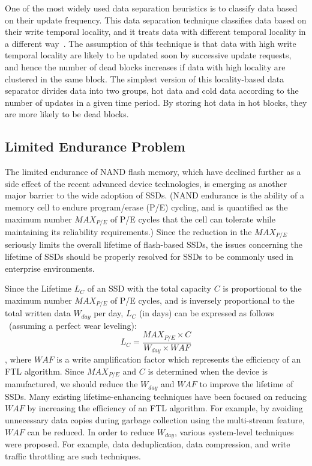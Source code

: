 One of the most widely used data separation heuristics is to classify
data based on their update frequency. This data separation technique classifies
data based on their write temporal locality, and it treats data with different
temporal locality in a different way~\cite{HotCold}. The assumption of this
technique is that data with high write temporal locality are likely to be updated
soon by successive update requests, and hence the number of dead
blocks increases if data with high locality are clustered in the same block.
The simplest version of this locality-based data separator divides data into
two groups, hot data and cold data according to the number of updates in a
given time period. By storing hot data in hot blocks, they are more likely to
be dead blocks.

\subsection{Limited Endurance Problem}

The limited endurance of NAND flash memory, which have
declined further as a side effect of the recent advanced device technologies,
is emerging as another major barrier to the wide adoption of SSDs. (NAND endurance
is the ability of a memory cell to endure program/erase (P/E) cycling, and is
quantified as the maximum number $MAX_{P/E}$ of P/E cycles that the cell can tolerate
while maintaining its reliability requirements.) 
Since the reduction in the $MAX_{P/E}$ seriously limits the overall lifetime of flash-based SSDs,
the issues concerning the lifetime of SSDs should be properly resolved for SSDs to be commonly 
used in enterprise environments.

Since the Lifetime $L_C$ of an SSD with the total capacity $C$ is proportional to 
the maximum number $MAX_{P/E}$ of P/E cycles, and is inversely proportional to the
total written data $W_{day}$ per day, $L_C$ (in days) can be expressed as follows
~\cite{DPES}(assuming a perfect wear leveling):
\[L_C = \frac{MAX_{P/E} \times C}{W_{day} \times WAF}\],
where $WAF$ is a write amplification factor which represents the efficiency of an FTL
algorithm. Since $MAX_{P/E}$ and $C$ is determined when the device is manufactured,
we should reduce the $W_{day}$ and $WAF$ to improve the lifetime of SSDs.
Many existing lifetime-enhancing techniques have been focused on reducing $WAF$
by increasing the efficiency of an FTL algorithm. For example, by avoiding
unnecessary data copies during garbage collection 
using the multi-stream feature, $WAF$ can be reduced.
In order to reduce $W_{day}$, various system-level techniques were proposed.
For example, data deduplication, data compression, and write traffic 
throttling are such techniques.

